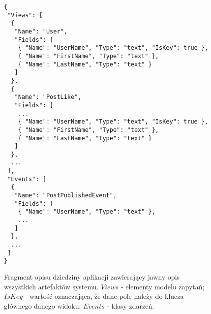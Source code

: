 \begin{figure}[!ht]
\begin{verbatim}
{
 "Views": [
  {
   "Name": "User",
   "Fields": [
    { "Name": "UserName", "Type": "text", "IsKey": true },
    { "Name": "FirstName", "Type": "text" },
    { "Name": "LastName", "Type": "text" }
   ]
  },
  {
   "Name": "PostLike",
   "Fields": [
    ...
    { "Name": "UserName", "Type": "text", "IsKey": true },
    { "Name": "FirstName", "Type": "text" },
    { "Name": "LastName", "Type": "text" }
   ]
  },
  ...
 ],
 "Events": [
  {
   "Name": "PostPublishedEvent",
   "Fields": [
    { "Name": "UserName", "Type": "text" },
    ...
   ]
  },
  ...
 ]
}
\end{verbatim}
\caption{
 Fragment opisu dziedziny aplikacji zawierający jawny opis wszystkich artefaktów systemu.
 $Views$ - elementy modelu zapytań; $IsKey$ - wartość oznaczająca, że dane pole należy do klucza głównego danego widoku; $Events$ - klasy zdarzeń.
}
\label{fig:single:model_verbose}
\end{figure}
